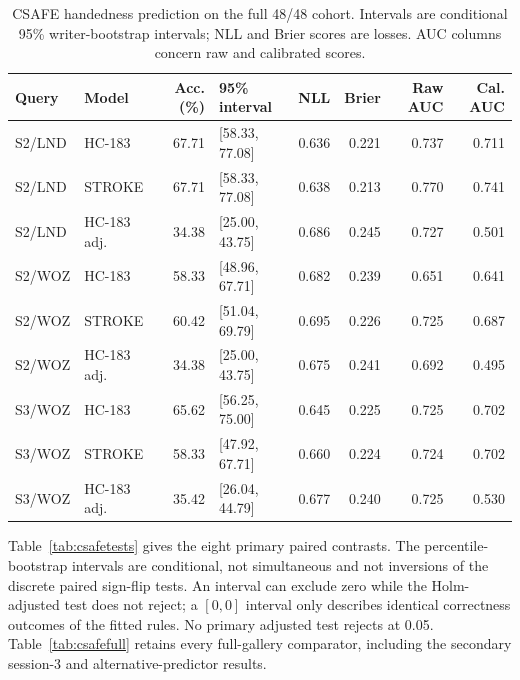 \documentclass[10pt,a4paper]{article}
\begin{document}
\begin{table}[ht]
\caption{CSAFE handedness prediction on the full 48/48 cohort. Intervals are conditional 95\% writer-bootstrap intervals; NLL and Brier scores are losses. AUC columns concern raw and calibrated scores.}\label{tab:csafehand}
\centering\footnotesize
\begin{tabular}{llrlrrrr}\toprule
Query & Model & Acc. (\%) & 95\% interval & NLL & Brier & Raw AUC & Cal. AUC\\\midrule
S2/LND & HC-183 & 67.71 & [58.33, 77.08] & 0.636 & 0.221 & 0.737 & 0.711 \\
S2/LND & STROKE & 67.71 & [58.33, 77.08] & 0.638 & 0.213 & 0.770 & 0.741 \\
S2/LND & HC-183 adj. & 34.38 & [25.00, 43.75] & 0.686 & 0.245 & 0.727 & 0.501 \\
S2/WOZ & HC-183 & 58.33 & [48.96, 67.71] & 0.682 & 0.239 & 0.651 & 0.641 \\
S2/WOZ & STROKE & 60.42 & [51.04, 69.79] & 0.695 & 0.226 & 0.725 & 0.687 \\
S2/WOZ & HC-183 adj. & 34.38 & [25.00, 43.75] & 0.675 & 0.241 & 0.692 & 0.495 \\
S3/WOZ & HC-183 & 65.62 & [56.25, 75.00] & 0.645 & 0.225 & 0.725 & 0.702 \\
S3/WOZ & STROKE & 58.33 & [47.92, 67.71] & 0.660 & 0.224 & 0.724 & 0.702 \\
S3/WOZ & HC-183 adj. & 35.42 & [26.04, 44.79] & 0.677 & 0.240 & 0.725 & 0.530 \\
\bottomrule
\end{tabular}
\end{table}

Table~\ref{tab:csafetests} gives the eight primary paired contrasts. The percentile-bootstrap intervals are conditional, not simultaneous and not inversions of the discrete paired sign-flip tests. An interval can exclude zero while the Holm-adjusted test does not reject; a $[0,0]$ interval only describes identical correctness outcomes of the fitted rules. No primary adjusted test rejects at 0.05. Table~\ref{tab:csafefull} retains every full-gallery comparator, including the secondary session-3 and alternative-predictor results.
\end{document}
